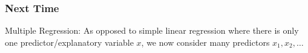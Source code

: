 \documentclass[handout]{beamer}
\newcommand{\blue}[1]{\textcolor{blue2}{#1}}
\begin{document}
\begin{frame}[fragile]
\frametitle{Next Time}

Multiple Regression:  As opposed to \blue{simple linear regression} where there is only one predictor/explanatory variable $x$, we now consider \blue{many} predictors $x_1, x_2, \ldots$

\end{frame}
\end{document}
